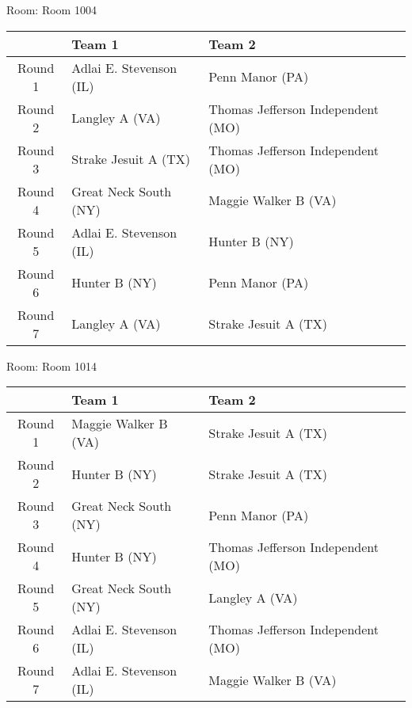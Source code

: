 \documentclass{article}%
\begin{document}
\vspace*{8pt}%
\linebreak%
\begin{flushleft}%
\begin{Large}%
Room: Room 1004%
\end{Large}%
\end{flushleft}%
\begin{tabularx}{\textwidth}{|c|Y|Y|}%
\hline%
&Team 1&Team 2\\%
\hline%
Round 1&Adlai E. Stevenson (IL)&Penn Manor (PA)\\%
Round 2&Langley A (VA)&Thomas Jefferson Independent (MO)\\%
Round 3&Strake Jesuit A (TX)&Thomas Jefferson Independent (MO)\\%
Round 4&Great Neck South (NY)&Maggie Walker B (VA)\\%
Round 5&Adlai E. Stevenson (IL)&Hunter B (NY)\\%
Round 6&Hunter B (NY)&Penn Manor (PA)\\%
Round 7&Langley A (VA)&Strake Jesuit A (TX)\\%
\hline%
\end{tabularx}%
\vspace*{8pt}%
\linebreak%
\begin{flushleft}%
\begin{Large}%
Room: Room 1014%
\end{Large}%
\end{flushleft}%
\begin{tabularx}{\textwidth}{|c|Y|Y|}%
\hline%
&Team 1&Team 2\\%
\hline%
Round 1&Maggie Walker B (VA)&Strake Jesuit A (TX)\\%
Round 2&Hunter B (NY)&Strake Jesuit A (TX)\\%
Round 3&Great Neck South (NY)&Penn Manor (PA)\\%
Round 4&Hunter B (NY)&Thomas Jefferson Independent (MO)\\%
Round 5&Great Neck South (NY)&Langley A (VA)\\%
Round 6&Adlai E. Stevenson (IL)&Thomas Jefferson Independent (MO)\\%
Round 7&Adlai E. Stevenson (IL)&Maggie Walker B (VA)\\%
\hline%
\end{tabularx}%
\vspace*{8pt}%
\linebreak%
\newline%
\end{document}
